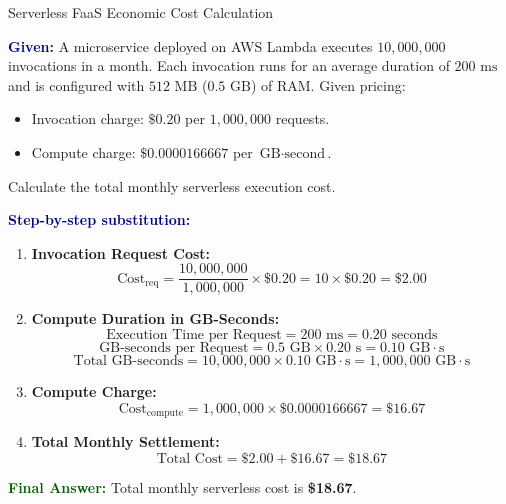 \documentclass[11pt,a4paper,openany]{report}
\newcommand{\Given}{\par\textbf{\textcolor{navy}{Given:}} }
\newcommand{\Steps}{\par\textbf{\textcolor{navy}{Step-by-step substitution:}}\par}
\newcommand{\Answer}{\par\textbf{\textcolor{darkgreen}{Final Answer:}} }
\begin{document}
\begin{solved}{Serverless FaaS Economic Cost Calculation}
\Given A microservice deployed on AWS Lambda executes $10,000,000$ invocations in a month. Each invocation runs for an average duration of $200\text{ ms}$ and is configured with $512\text{ MB}$ ($0.5\text{ GB}$) of RAM. Given pricing:
\begin{itemize}
  \item Invocation charge: $\$0.20$ per $1,000,000$ requests.
  \item Compute charge: $\$0.0000166667$ per $\text{GB}\cdot\text{second}$.
\end{itemize}
Calculate the total monthly serverless execution cost.
\Steps
\begin{enumerate}[leftmargin=*]
  \item \textbf{Invocation Request Cost:}
  \begin{equation}
  \text{Cost}_{\text{req}} = \frac{10,000,000}{1,000,000} \times \$0.20 = 10 \times \$0.20 = \$2.00
  \end{equation}
  \item \textbf{Compute Duration in GB-Seconds:}
  \begin{equation}
  \text{Execution Time per Request} = 200\text{ ms} = 0.20\text{ seconds}
  \end{equation}
  \begin{equation}
  \text{GB-seconds per Request} = 0.5\text{ GB} \times 0.20\text{ s} = 0.10\text{ GB}\cdot\text{s}
  \end{equation}
  \begin{equation}
  \text{Total GB-seconds} = 10,000,000 \times 0.10\text{ GB}\cdot\text{s} = 1,000,000\text{ GB}\cdot\text{s}
  \end{equation}
  \item \textbf{Compute Charge:}
  \begin{equation}
  \text{Cost}_{\text{compute}} = 1,000,000 \times \$0.0000166667 = \$16.67
  \end{equation}
  \item \textbf{Total Monthly Settlement:}
  \begin{equation}
  \text{Total Cost} = \$2.00 + \$16.67 = \$18.67
  \end{equation}
\end{enumerate}
\Answer Total monthly serverless cost is \textbf{\$18.67}.
\end{solved}
\end{document}
